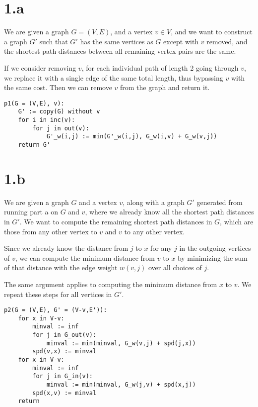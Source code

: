 \documentclass{article}
\begin{document}
\section*{1.a}

We are given a graph $G = (V,E)$, and a vertex $v \in V$, and we want to
construct a graph $G'$ such that $G'$ has the same vertices as $G$ except with
$v$ removed, and the shortest path distances between all remaining vertex
pairs are the same.

If we consider removing $v$, for each individual path of length 2 going
through $v$, we replace it with a single edge of the same total length, thus
bypassing $v$ with the same cost. Then we can remove $v$ from the graph and
return it.

\begin{verbatim}
p1(G = (V,E), v):
    G' := copy(G) without v
    for i in inc(v):
        for j in out(v):
            G'_w(i,j) := min(G'_w(i,j), G_w(i,v) + G_w(v,j))
    return G'
\end{verbatim}

\section*{1.b}

We are given a graph $G$ and a vertex $v$, along with a graph $G'$ generated
from running part a on $G$ and $v$, where we already know all the shortest
path distances in $G'$. We want to compute the remaining shortest path
distances in $G$, which are those from any other vertex to $v$ and $v$ to any
other vertex.

Since we already know the distance from $j$ to $x$ for any $j$ in the
outgoing vertices of $v$, we can compute the minimum distance from $v$ to $x$
by minimizing the sum of that distance with the edge weight $w(v,j)$ over all
choices of $j$.

The same argument applies to computing the minimum distance from $x$ to $v$.
We repeat these steps for all vertices in $G'$.

\begin{verbatim}
p2(G = (V,E), G' = (V-v,E')):
    for x in V-v:
        minval := inf
        for j in G_out(v):
            minval := min(minval, G_w(v,j) + spd(j,x))
        spd(v,x) := minval
    for x in V-v:
        minval := inf
        for j in G_in(v):
            minval := min(minval, G_w(j,v) + spd(x,j))
        spd(x,v) := minval
    return
\end{verbatim}
\end{document}
